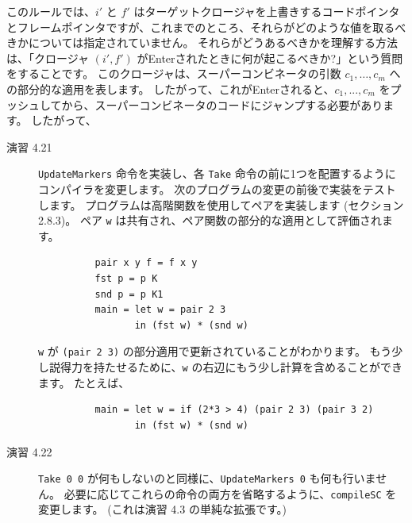 \documentclass{jbook}
\begin{document}
このルールでは、$i'$ と $f'$ はターゲットクロージャを上書きするコードポインタとフレームポインタですが、これまでのところ、それらがどのような値を取るべきかについては指定されていません。
それらがどうあるべきかを理解する方法は、「クロージャ $(i', f')$ がEnterされたときに何が起こるべきか?」という質問をすることです。
このクロージャは、スーパーコンビネータの引数 $c_1, \ldots, c_m$ への部分的な適用を表します。
したがって、これがEnterされると、$c_1, ..., c_m$ をプッシュしてから、スーパーコンビネータのコードにジャンプする必要があります。
したがって、


\begin{description}
	\item[演習 4.21] \texttt{UpdateMarkers} 命令を実装し、各 \texttt{Take} 命令の前に1つを配置するようにコンパイラを変更します。
		次のプログラムの変更の前後で実装をテストします。
		プログラムは高階関数を使用してペアを実装します (セクション 2.8.3)。
		ペア \texttt{w} は共有され、ペア関数の部分的な適用として評価されます。
		\begin{verbatim}
          pair x y f = f x y
          fst p = p K
          snd p = p K1
          main = let w = pair 2 3
                 in (fst w) * (snd w)
        \end{verbatim}
		\texttt{w} が \texttt{(pair 2 3)} の部分適用で更新されていることがわかります。
		もう少し説得力を持たせるために、\texttt{w} の右辺にもう少し計算を含めることができます。
		たとえば、
		\begin{verbatim}
          main = let w = if (2*3 > 4) (pair 2 3) (pair 3 2)
                 in (fst w) * (snd w)
        \end{verbatim}
	\item[演習 4.22] \texttt{Take 0 0} が何もしないのと同様に、\texttt{UpdateMarkers 0} も何も行いません。
		必要に応じてこれらの命令の両方を省略するように、\texttt{compileSC} を変更します。
		(これは演習 4.3 の単純な拡張です。)
\end{description}
\end{document}
